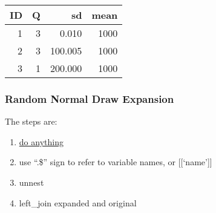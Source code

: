 \documentclass[
]{book}
\newenvironment{Shaded}{\begin{snugshade}}{\end{snugshade}}
\newcommand{\CommentTok}[1]{\textcolor[rgb]{0.56,0.35,0.01}{\textit{#1}}}
\newcommand{\DataTypeTok}[1]{\textcolor[rgb]{0.13,0.29,0.53}{#1}}
\newcommand{\DecValTok}[1]{\textcolor[rgb]{0.00,0.00,0.81}{#1}}
\newcommand{\FloatTok}[1]{\textcolor[rgb]{0.00,0.00,0.81}{#1}}
\newcommand{\KeywordTok}[1]{\textcolor[rgb]{0.13,0.29,0.53}{\textbf{#1}}}
\newcommand{\NormalTok}[1]{#1}
\newcommand{\OperatorTok}[1]{\textcolor[rgb]{0.81,0.36,0.00}{\textbf{#1}}}
\newcommand{\OtherTok}[1]{\textcolor[rgb]{0.56,0.35,0.01}{#1}}
\newcommand{\StringTok}[1]{\textcolor[rgb]{0.31,0.60,0.02}{#1}}
\providecommand{\tightlist}{%
  \setlength{\itemsep}{0pt}\setlength{\parskip}{0pt}}
\begin{document}
\begin{Shaded}
\end{Shaded}

\begin{table}[!h]
\centering
\begin{tabular}{r|r|r|r}
\hline
ID & Q & sd & mean\\
\hline
\rowcolor{gray!6}  1 & 3 & 0.010 & 1000\\
\hline
2 & 3 & 100.005 & 1000\\
\hline
\rowcolor{gray!6}  3 & 1 & 200.000 & 1000\\
\hline
\end{tabular}
\end{table}

\hypertarget{random-normal-draw-expansion}{%
\subsubsection{Random Normal Draw Expansion}\label{random-normal-draw-expansion}}

The steps are:

\begin{enumerate}
\def\labelenumi{\arabic{enumi}.}
\tightlist
\item
  \href{https://dplyr.tidyverse.org/reference/do.html}{do anything}
\item
  use ``.\$'' sign to refer to variable names, or {[}{[}`name'{]}{]}
\item
  unnest
\item
  left\_join expanded and original
\end{enumerate}
\end{document}
